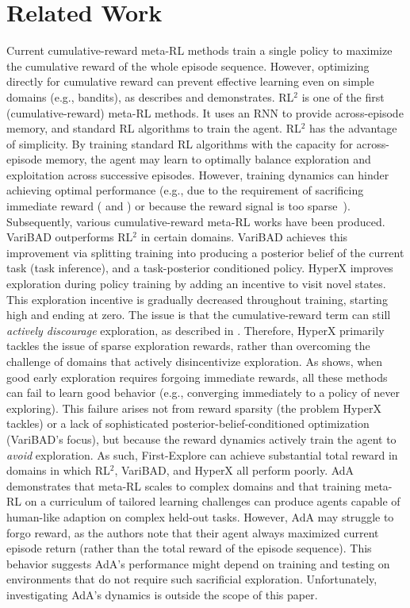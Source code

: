 \documentclass{article}
\begin{document}
\section{Related Work}
Current cumulative-reward meta-RL methods train a single policy to maximize the cumulative reward of the whole episode sequence. However, optimizing directly for cumulative reward can prevent effective learning even on simple domains (e.g., bandits), as  describes and  demonstrates.
RL\(^2\) \citep{rl2, rl2alt} is one of the first (cumulative-reward) meta-RL methods. It uses an RNN to provide across-episode memory, and standard RL algorithms to train the agent. RL\(^2\) has the advantage of simplicity. By training standard RL algorithms with the capacity for across-episode memory, the agent may learn to optimally balance exploration and exploitation across successive episodes.
However, training dynamics can hinder achieving optimal performance (e.g., due to the requirement of sacrificing immediate reward ( and ) or because the reward signal is too sparse~\cite{hyperx}).
Subsequently, various cumulative-reward meta-RL works have been produced.
VariBAD \citep{VariBAD} outperforms RL\(^2\) in certain domains. VariBAD achieves this improvement via splitting training into producing a posterior belief of the current task (task inference), and a task-posterior conditioned policy.
HyperX \citep{hyperx} improves exploration during policy training by adding an incentive to visit novel states. This exploration incentive is gradually decreased throughout training, starting high and ending at zero.
The issue is that the cumulative-reward term can still \emph{actively discourage} exploration, as described in .
Therefore, HyperX primarily tackles the issue of sparse exploration rewards, rather than overcoming the challenge of domains that actively disincentivize exploration.
As  shows, when good early exploration requires forgoing immediate rewards, all these methods can fail to learn good behavior (e.g., converging immediately to a policy of never exploring). This failure arises not from reward sparsity (the problem HyperX tackles) or a lack of sophisticated posterior-belief-conditioned optimization (VariBAD's focus), but because the reward dynamics actively train the agent to \emph{avoid} exploration. As such, First-Explore can achieve substantial total reward in domains in which RL\(^2\), VariBAD, and HyperX all perform poorly.
AdA \citep{adaptiveagentteam2023humantimescale} demonstrates that meta-RL scales to complex domains and that training meta-RL on a curriculum of tailored learning challenges can produce agents capable of human-like adaption on complex held-out tasks. However, AdA may struggle to forgo reward, as the authors note that their agent always maximized current episode return (rather than the total reward of the episode sequence). This behavior suggests AdA's performance might depend on training and testing on environments that do not require such sacrificial exploration. Unfortunately, investigating AdA's dynamics is outside the scope of this paper.
\end{document}
